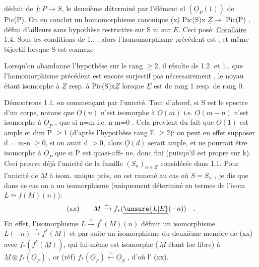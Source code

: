 
déduit de $f:P\longrightarrow S$, le deuxième  déterminé par l'élément  cl $(\underline{O}_P(1))$ de
Pic(P). On en conclut un homomorphisme canonique
(x) \qquad Pic(S)x $\underline{Z} \longrightarrow$ Pic(P)  ,
défini d'ailleurs sans hypothèse restrictive sur S ni sur $\underline{E}$.  Ceci posé:
\uline{Corollaire} 1.4.   Sous les conditions de 1.. ,  
 alors l'homomorphisme précédent est   , et même
bijectif lorsque S est connexe

\margin{[} Lorsqu'on  abandonne l'hypothèse
sur le rang $\geqslant 2$,  il résulte de 1.2. et 1.. que l'homomorphisme précédent
est encore surjectif  pas nécessairement , le noyau étant
isomorphe 
à $\underline{Z}$  resp. à  Pic(S)x$\underline{Z}$  lorsque  $\underline{E}$  est de rang 1\hand{,} resp. de rang 0.

Démontrons  1.1.  en commençant par l'unicité.  Tout d'abord, si S est
le spectre d'un corps, notons que  $\underline{O}(n)$ n'est isomorphe à $\underline{O}(m)$ i.e.
$\underline{O}(m-n)$  n'est  isomorphe à $\underline{O}_P$ , que si  n=m i.e.  n-m=0 .  Cela provient
du fait que $\underline{O}(1)$ est ample et  dim P $\geqslant$1 (d'après l'hypothèse rang E $\geqslant$2):
on peut en effet supposer  d = m-n $\geqslant$0, si on avait d $>$0, alors $\underline{O}(d)$
serait ample, et ne pourrait être isomorphe à  $\underline{O}_P$ que si P est quasi-affi-%
ne, donc fini (puisqu'il est propre sur k).  Ceci prouve déjà  l'unicité
de la famille $(S_n)_{n\in\underline{Z}}$  considérée dans 1.1.  Pour l'unicité de $\underline{M}$ à isom.
unique près, on est ramené au cas où  $S=S_n$ , je dis que dans ce cas on a
un isomorphisme  (uniquement déterminé en termes de l'isom  $\underline{L} \simeq f$\over{$_*$}{$^*$}$(\underline{M})(n)$):
\[ \text{(xx)} \qquad M \xrightarrow{\sim} f_*(\underline{\unsure{L|E}}(-n)) \quad . \]
En effet,  l'isomorphisme  $\underline{L} \xrightarrow{\sim} f^*(\underline{M})(n)$   définit un isomorphisme
$\underline{L}(-n) \xrightarrow{\sim} f^*(\underline{M})$  et par suite un isomorphisme du deuxième membre de (xx)
avec $f_*(f^*(\underline{M}))$, qui lui-même est isomorphe (\,$\underline{M}$ étant loc libre) à
$\underline{M}\otimes f_*(\underline{O}_P)$ , or  (réf)  $f_*(\underline{O}_P) \xleftarrow{\sim} \underline{O}_S$ ,  d'où l' (xx).

